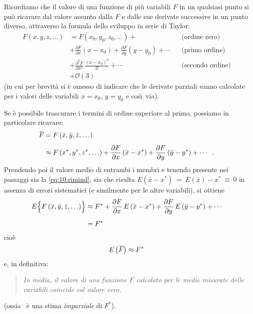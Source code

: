 Ricordiamo che il valore di una funzione di pi\`u variabili
$F$ in un qualsiasi punto si pu\`o ricavare dal valore
assunto dalla $F$ e dalle sue derivate successive in un
punto diverso, attraverso la formula dello sviluppo in serie
di Taylor:
\begin{align*}
  F(x,y,z,\ldots) &= F \left( x_0,y_0,z_0,
    \ldots\right) + && \text{(ordine zero)}
    \\[1ex]
  &+ \frac{\partial F}{\partial x} \left( x - x_0
    \right) + \frac{\partial F}{\partial y} \left(
    y - y_0 \right) +\cdots && \text{(primo
    ordine)} \\[1ex]
  &+ \frac{ \partial^2 F}{\partial x^2} \,
    \frac{\left( x - x_0 \right)^2}{2!} +\cdots
    && \text{(secondo ordine)} \\[1.5ex]
  &+ \mathcal{O}(3)
\end{align*}
(in cui per brevit\`a si \`e omesso di indicare che le
derivate parziali vanno calcolate per i valori delle
variabili $ x = x_0 $, $ y = y_0 $ e cos\`\i\ via).

Se \`e possibile trascurare i termini di ordine superiore al
primo, possiamo in particolare ricavare:
\begin{align*}
  \ob{F} &= F \left( \bar x, \bar y, \bar z,
   \ldots\right) \\[1ex]
  &\approx F \left( x^*, y^*, z^*,\ldots\right) +
    \frac{\partial F}{\partial x} \left( \bar x -
    x^* \right) + \frac{\partial F}{\partial y}
    \left( \bar y - y^* \right) + \cdots \peq .
\end{align*}
Prendendo poi il valore medio di entrambi i membri e tenendo
presente nei passaggi sia la \eqref{eq:10.rimind}, sia che
risulta $ E( \bar x - x^* ) \: = \: E(\bar x)-x^* \: \equiv
\: 0 $ in assenza di errori sistematici (e similmente per le
altre variabili), si ottiene
\begin{align*}
  E \Bigl \{ F \left( \bar x, \bar y, \bar z,
   \ldots\right) \Bigr \} &\approx F^* +
    \frac{\partial F}{\partial x} \, E \left( \bar x
    - x^* \right) + \frac{\partial F}{\partial y} \,
    E \left( \bar y - y^* \right) +\cdots \\[1ex]
  &= F^*
\end{align*}
cio\`e
\begin{equation*}
  E \left( \ob{F} \right) \approx F^*
\end{equation*}
e, in definitiva:
\begin{quote}
  \textit{In media, il valore di una funzione $F$ calcolato
    per le medie misurate delle variabili coincide col
    valore vero.}
\end{quote}
(ossia \ \`e una stima \emph{imparziale}%
di $F^*$).

